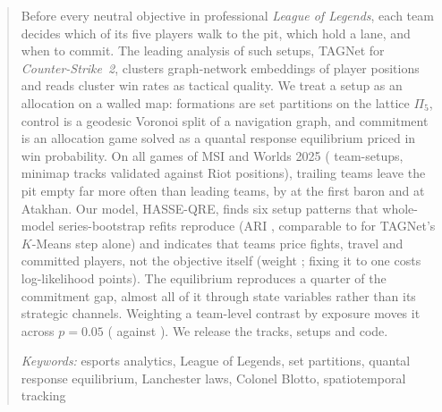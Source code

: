 \begin{abstract}
Before every neutral objective in professional \emph{League of Legends}, each team decides which of its five players walk to the pit, which hold a lane, and when to commit.
The leading analysis of such setups, TAGNet for \emph{Counter-Strike~2}, clusters graph-network embeddings of player positions and reads cluster win rates as tactical quality.
We treat a setup as an allocation on a walled map: formations are set partitions on the lattice $\Pi_5$, control is a geodesic Voronoi split of a navigation graph, and commitment is an allocation game solved as a quantal response equilibrium priced in win probability.
On all  games of MSI and Worlds 2025 ( team-setups, minimap tracks validated against Riot positions), trailing teams leave the pit empty far more often than leading teams, by \pp{} at the first baron and \pp{} at Atakhan.
Our model, HASSE-QRE, finds six setup patterns that whole-model series-bootstrap refits reproduce (ARI , comparable to  for TAGNet's $K$-Means step alone) and indicates that teams price fights, travel and committed players, not the objective itself (weight ; fixing it to one costs  log-likelihood points).
The equilibrium reproduces a quarter of the commitment gap, almost all of it through state variables rather than its strategic channels.
Weighting a team-level contrast by exposure moves it across $p=0.05$ ( against ).
We release the tracks, setups and code.
\par\smallskip\noindent\textit{Keywords:} esports analytics, League of Legends, set partitions, quantal response equilibrium, Lanchester laws, Colonel Blotto, spatiotemporal tracking
\end{abstract}
